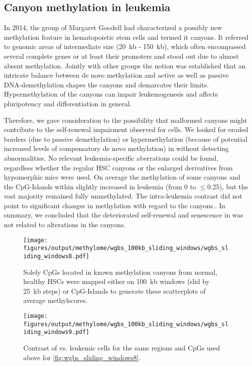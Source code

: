 \subsection{Canyon methylation in \mllafnine leukemia}

In 2014, the group of Margaret Goodell had characterized a possibly new methylation feature in hematopoietic stem cells and termed it canyons\cite{Jeong2014}. It referred to genomic areas of intermediate size (\SI{20}{\kilo b} - \SI{150}{\kilo b}), which often encompassed several complete genes or at least their promoters and stood out due to almost absent methylation. Jointly with other groups the notion was established that an intricate balance between de novo methylation and active as well as passive DNA-demethylation shapes the canyons and demarcates their limits\cite{Challen2014,Wiehle2016}. Hypermethylation of the canyons can 
impair leukemogenesis\cite{Schulze2016} and affects pluripotency and differentiation in general\cite{Rulands2018}.

Therefore, we gave consideration to the possibility that malformed canyons might contribute to the self-renewal impairment observed for \dnmtchip \kitpos cells. We looked for eroded borders (due to passive demethylation) or hypermethylation (because of potential increased levels of compensatory de novo methylation) in \dnmtchip without detecting abnormalities\dns. No relevant leukemia-specific aberrations could be found, regardless whether the regular HSC canyons or the enlarged derivatives from  hypomorphic mice were used. On average the methylation of some canyons and the CpG-Islands within slightly increased in \dnmtwt leukemia (from \num{0} to $\leq$\num{0.25}), but the vast majority remained fully unmethylated. The intra-leukemia contrast did not point to significant changes in methylation with regard to the canyons.. In summary, we concluded that the deteriorated self-renewal and senescence in \dnmtchip was not related to alterations in the canyons. 

\begin{figure}[!ht]
	\centering
	\texttt{[image: figures/output/methylome/wgbs\_100kb\_sliding\_windows/wgbs\_sliding\_windows8.pdf]} 
	\caption[Scatterplot of canyon methylation for \dnmtwt HSC vs. LSC contrast]{Solely CpGs located in known methylation canyons from normal, healthy HSCs were mapped either on \SI{100}{\kilo b} windows (slid by \SI{25}{\kilo b} steps) or CpG-Islands to generate these scatterplots of average methylscores.}
	\label{fig:wgbs_sliding_windows8}
\end{figure}

\begin{figure}[!ht]
	\centering
	\texttt{[image: figures/output/methylome/wgbs\_100kb\_sliding\_windows/wgbs\_sliding\_windows9.pdf]} 
	\caption[Scatterplot of intra-leukemia comparison for canyons]{Contrast of \dnmtchip vs. \dnmtwt \kitpos leukemic cells for the same regions and CpGs used above for \autoref{fig:wgbs_sliding_windows8}.}
	\label{fig:wgbs_sliding_windows9}
\end{figure}